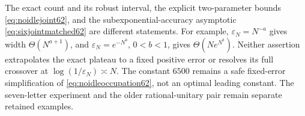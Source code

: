 \begin{remark}\label{rem:threeaccuracy62}
The exact count and its robust interval, the explicit two-parameter
bounds \eqref{eq:noidlejoint62}, and the subexponential-accuracy
asymptotic \eqref{eq:sixjointmatched62} are different statements.
For example, $\varepsilon_N=N^{-a}$ gives width $\Theta(N^{a+1})$,
and $\varepsilon_N=e^{-N^b}$, $0<b<1$, gives
$\Theta(Ne^{N^b})$. Neither assertion extrapolates the exact plateau
to a fixed positive error or resolves its full crossover at
$\log(1/\varepsilon_N)\asymp N$. The constant $6500$ remains a safe
fixed-error simplification of \eqref{eq:noidleoccupation62}, not an
optimal leading constant. The seven-letter experiment and the older
rational-unitary pair remain separate retained examples.
\end{remark}
